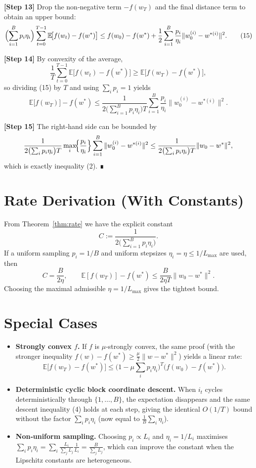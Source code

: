 \documentclass{article}
\newcommand{\E}{\mathbb{E}}
\begin{document}
\noindent\textbf{[Step 13]}  Drop the non‑negative term $-f(w_T)$ and the final
distance term to obtain an upper bound:
\[
\Bigl(\sum_{i=1}^{B}p_i\eta_i\Bigr)
\sum_{t=0}^{T-1}\E\!\bigl[f(w_t)-f(w^{*})\bigr]
\le
f(w_0)-f(w^{*})
+\frac{1}{2}\sum_{i=1}^{B}\frac{p_i}{\eta_i}\|w_0^{(i)}-w^{*(i)}\|^{2}.
\tag{15}
\]

\noindent\textbf{[Step 14]}  By convexity of the average,
\[
\frac{1}{T}\sum_{t=0}^{T-1}\E\!\bigl[f(w_t)-f(w^{*})\bigr]
\ge \E\!\bigl[f(w_T)-f(w^{*})\bigr],
\]
so dividing (15) by $T$ and using $\sum_i p_i=1$ yields
\[
\E\!\bigl[f(w_T)\bigr]-f(w^{*})
\le
\frac{1}{2\bigl(\sum_{i=1}^{B}p_i\eta_i\bigr)T}
\sum_{i=1}^{B}\frac{p_i}{\eta_i}\|w_0^{(i)}-w^{*(i)}\|^{2}.
\tag{16}
\]

\noindent\textbf{[Step 15]}  The right‑hand side can be bounded by
\[
\frac{1}{2\bigl(\sum_{i}p_i\eta_i\bigr)T}
\max_{i}\!\Bigl\{\frac{p_i}{\eta_i}\Bigr\}
\sum_{i=1}^{B}\|w_0^{(i)}-w^{*(i)}\|^{2}
\le
\frac{1}{2\bigl(\sum_{i}p_i\eta_i\bigr)T}
\|w_0-w^{*}\|^{2},
\]
which is exactly inequality (2).  ∎

\section*{Rate Derivation (With Constants)}
From Theorem~\ref{thm:rate} we have the explicit constant
\[
C:=\frac{1}{2\bigl(\sum_{i=1}^{B}p_i\eta_i\bigr)}.
\]
If a uniform sampling $p_i=1/B$ and uniform stepsizes $\eta_i=\eta\le 1/L_{\max}$
are used, then
\[
C=\frac{B}{2\eta},
\qquad
\E[f(w_T)]-f(w^{*})\le \frac{B}{2\eta T}\|w_0-w^{*}\|^{2}.
\]
Choosing the maximal admissible $\eta=1/L_{\max}$ gives the tightest bound.

\section*{Special Cases}
\begin{itemize}
\item \textbf{Strongly convex $f$.} If $f$ is $\mu$‑strongly convex,
the same proof (with the stronger inequality
$f(w)-f(w^{*})\ge \frac{\mu}{2}\|w-w^{*}\|^{2}$) yields a linear rate:
\[
\E\!\bigl[f(w_T)-f(w^{*})\bigr]\le
\bigl(1-\mu\sum_{i}p_i\eta_i\bigr)^{T}
\bigl(f(w_0)-f(w^{*})\bigr).
\]

\item \textbf{Deterministic cyclic block coordinate descent.}
When $i_t$ cycles deterministically through $\{1,\dots ,B\}$,
the expectation disappears and the same descent inequality (4) holds
at each step, giving the identical $O(1/T)$ bound without the factor
$\sum_i p_i\eta_i$ (now equal to $\frac{1}{B}\sum_i\eta_i$).

\item \textbf{Non‑uniform sampling.}
Choosing $p_i\propto L_i$ and $\eta_i=1/L_i$ maximises
$\sum_i p_i\eta_i = \sum_i \frac{L_i}{\sum_j L_j}\frac{1}{L_i}= \frac{B}{\sum_j L_j}$,
which can improve the constant when the Lipschitz constants are heterogeneous.
\end{itemize}
\end{document}
